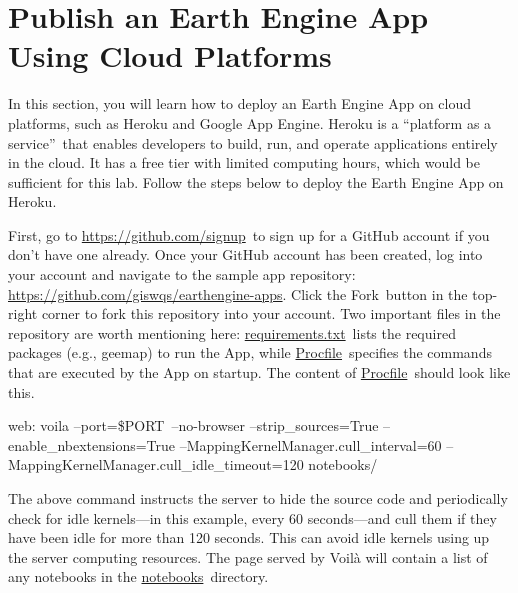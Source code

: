 \documentclass[
  letterpaper,
  DIV=11,
  numbers=noendperiod]{scrreprt}
\begin{document}
\hypertarget{publish-an-earth-engine-app-using-cloud-platforms}{%
\section{Publish an Earth Engine App Using Cloud
Platforms}\label{publish-an-earth-engine-app-using-cloud-platforms}}

In this section, you will learn how to deploy an Earth Engine App on
cloud platforms, such as Heroku and Google App Engine. Heroku is a
``platform as a service''~that enables developers to build, run, and
operate applications entirely in the cloud. It has a free tier with
limited computing hours, which would be sufficient for this lab. Follow
the steps below to deploy the Earth Engine App on Heroku.

First, go to
\href{https://www.google.com/url?q=https://github.com/signup\&sa=D\&source=editors\&ust=1671458841334585\&usg=AOvVaw3ZgJomY_82B7WiuJEZym5g}{https://github.com/signup}~to
sign up for a GitHub account if you don't have one already. Once your
GitHub account has been created, log into your account and navigate to
the sample app repository:
\href{https://www.google.com/url?q=https://github.com/giswqs/earthengine-apps\&sa=D\&source=editors\&ust=1671458841335025\&usg=AOvVaw1IQJyv6EFLU5bCmsOsYkfX}{https://github.com/giswqs/earthengine-apps}.
Click the Fork~button in the top-right corner to fork this repository
into your account. Two important files in the repository are worth
mentioning here:
\href{https://www.google.com/url?q=https://github.com/giswqs/earthengine-apps/blob/master/requirements.txt\&sa=D\&source=editors\&ust=1671458841335397\&usg=AOvVaw23DFUPWYa0pVU-kSzjGeHr}{requirements.txt}~lists
the required packages (e.g., geemap) to run the App, while
\href{https://www.google.com/url?q=https://github.com/giswqs/earthengine-apps/blob/master/Procfile\&sa=D\&source=editors\&ust=1671458841335755\&usg=AOvVaw2_QbFT8c3ahut0eHTdTmUh}{Procfile}~specifies
the commands that are executed by the App on startup. The content of
\href{https://www.google.com/url?q=https://github.com/giswqs/earthengine-apps/blob/master/Procfile\&sa=D\&source=editors\&ust=1671458841336035\&usg=AOvVaw2MdhcFIHFTRIbZBL-XZFCb}{Procfile}~should
look like this.

web: voila --port=\$PORT~--no-browser --strip\_sources=True
--enable\_nbextensions=True --MappingKernelManager.cull\_interval=60
--MappingKernelManager.cull\_idle\_timeout=120 notebooks/

The above command instructs the server to hide the source code and
periodically check for idle kernels---in this example, every 60
seconds---and cull them if they have been idle for more than 120
seconds. This can avoid idle kernels using up the server computing
resources. The page served by Voilà will contain a list of any notebooks
in the
\href{https://www.google.com/url?q=https://github.com/giswqs/earthengine-apps/tree/master/notebooks\&sa=D\&source=editors\&ust=1671458841337601\&usg=AOvVaw1pHGG9qzGbdG7h7tVr7C9e}{notebooks}~directory.
\end{document}
